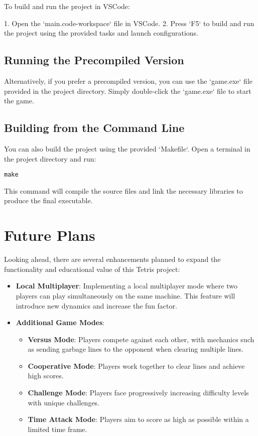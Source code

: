 \documentclass{article}
\begin{document}
To build and run the project in VSCode:

1. Open the `main.code-workspace` file in VSCode.
2. Press `F5` to build and run the project using the provided tasks and launch configurations.

\subsection{Running the Precompiled Version}

Alternatively, if you prefer a precompiled version, you can use the `game.exe` file provided in the project directory. Simply double-click the `game.exe` file to start the game.

\subsection{Building from the Command Line}

You can also build the project using the provided `Makefile`. Open a terminal in the project directory and run:

\begin{verbatim}
make
\end{verbatim}

This command will compile the source files and link the necessary libraries to produce the final executable.

\section{Future Plans}

Looking ahead, there are several enhancements planned to expand the functionality and educational value of this Tetris project:

\begin{itemize}
    \item \textbf{Local Multiplayer}: Implementing a local multiplayer mode where two players can play simultaneously on the same machine. This feature will introduce new dynamics and increase the fun factor.
    \item \textbf{Additional Game Modes}:
    \begin{itemize}
        \item \textbf{Versus Mode}: Players compete against each other, with mechanics such as sending garbage lines to the opponent when clearing multiple lines.
        \item \textbf{Cooperative Mode}: Players work together to clear lines and achieve high scores.
        \item \textbf{Challenge Mode}: Players face progressively increasing difficulty levels with unique challenges.
        \item \textbf{Time Attack Mode}: Players aim to score as high as possible within a limited time frame.
    \end{itemize}
\end{itemize}
\end{document}
